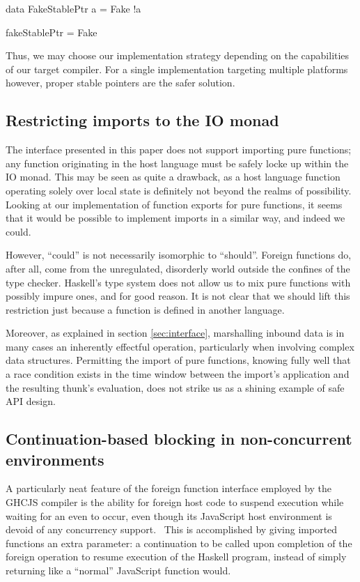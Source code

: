 \documentclass{sigplanconf}
\begin{document}
\begin{code}
  data FakeStablePtr a = Fake !a
  
  fakeStablePtr = Fake
\end{code}

Thus, we may choose our implementation strategy depending on the capabilities
of our target compiler. For a single implementation targeting multiple
platforms however, proper stable pointers are the safer solution.

\subsection{Restricting imports to the IO monad}
The interface presented in this paper does not support importing pure
functions; any function originating in the host language must be safely locke
up within the IO monad. This may be seen as quite a drawback, as a host
language function operating solely over local state is definitely not
beyond the realms of possibility. Looking at our implementation of function
exports for pure functions, it seems that it would be possible to implement
imports in a similar way, and indeed we could.

However, ``could'' is not necessarily isomorphic to ``should''.
Foreign functions do, after all, come from the unregulated, disorderly world
outside the confines of the type checker. Haskell's type system does not
allow us to mix pure functions with possibly impure ones, and for good
reason. It is not clear that we should lift this
restriction just because a function is defined in another language.

Moreover, as explained in section \ref{sec:interface}, marshalling inbound
data is in many cases an inherently effectful operation, particularly when
involving complex data structures. Permitting the import of pure functions,
knowing fully well that a race condition exists in the time window between
the import's application and the resulting thunk's evaluation, does not strike
us as a shining example of safe API design.

\subsection{Continuation-based blocking in non-concurrent environments}
A particularly neat feature of the foreign function interface employed by the
GHCJS compiler is the ability for foreign host code to suspend execution while
waiting for an even to occur, even though its JavaScript host environment is
devoid of any concurrency support.\ \cite{ghcjs}
This is accomplished by giving imported functions an extra parameter:
a continuation to be called upon completion
of the foreign operation to resume execution of the Haskell program, instead
of simply returning like a ``normal'' JavaScript function would.
\end{document}
